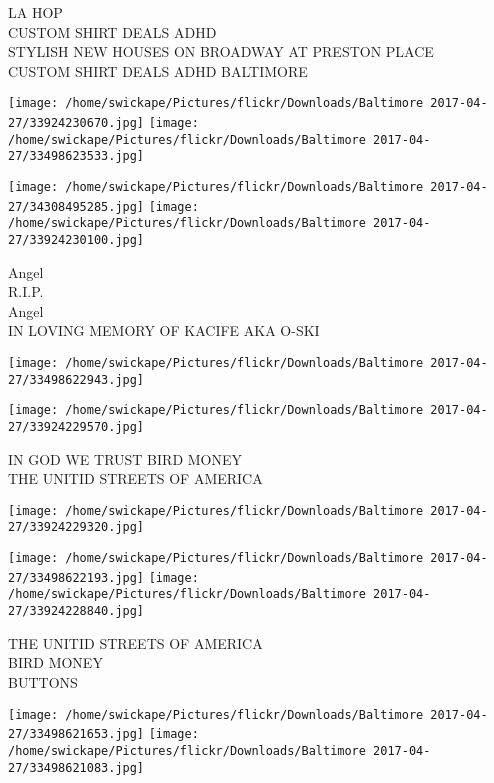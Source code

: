 \documentclass[10pt,letterpaper]{article}
\begin{document}
LA HOP\\
CUSTOM SHIRT DEALS ADHD\\
STYLISH NEW HOUSES ON BROADWAY AT PRESTON PLACE\\
CUSTOM SHIRT DEALS ADHD BALTIMORE\\
\pagebreak

\texttt{[image: /home/swickape/Pictures/flickr/Downloads/Baltimore 2017-04-27/33924230670.jpg]}
\texttt{[image: /home/swickape/Pictures/flickr/Downloads/Baltimore 2017-04-27/33498623533.jpg]}

\texttt{[image: /home/swickape/Pictures/flickr/Downloads/Baltimore 2017-04-27/34308495285.jpg]}
\texttt{[image: /home/swickape/Pictures/flickr/Downloads/Baltimore 2017-04-27/33924230100.jpg]}

Angel\\
R.I.P.\\
Angel\\
IN LOVING MEMORY OF KACIFE AKA O{-}SKI\\
\pagebreak

\texttt{[image: /home/swickape/Pictures/flickr/Downloads/Baltimore 2017-04-27/33498622943.jpg]}

\vspace{0.25in}
\texttt{[image: /home/swickape/Pictures/flickr/Downloads/Baltimore 2017-04-27/33924229570.jpg]}

IN GOD WE TRUST BIRD MONEY\\
THE UNITID STREETS OF AMERICA\\
\pagebreak

\texttt{[image: /home/swickape/Pictures/flickr/Downloads/Baltimore 2017-04-27/33924229320.jpg]}

\vspace{0.25in}
\texttt{[image: /home/swickape/Pictures/flickr/Downloads/Baltimore 2017-04-27/33498622193.jpg]}
\texttt{[image: /home/swickape/Pictures/flickr/Downloads/Baltimore 2017-04-27/33924228840.jpg]}

THE UNITID STREETS OF AMERICA\\
BIRD MONEY\\
BUTTONS\\
\pagebreak

\texttt{[image: /home/swickape/Pictures/flickr/Downloads/Baltimore 2017-04-27/33498621653.jpg]}
\texttt{[image: /home/swickape/Pictures/flickr/Downloads/Baltimore 2017-04-27/33498621083.jpg]}
\end{document}
